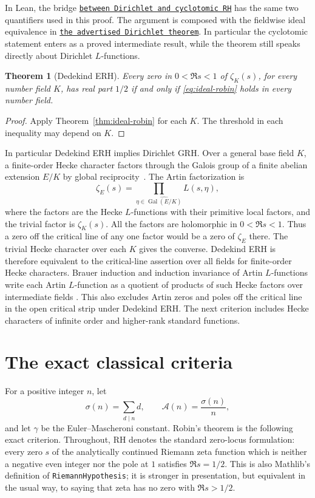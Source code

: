 \documentclass[11pt]{amsart}
\newtheorem{theorem}{Theorem}[section]
\theoremstyle{definition}
\theoremstyle{remark}
\numberwithin{equation}{section}
\newcommand{\RH}{\mathrm{RH}}
\newcommand{\euler}{\gamma}
\newcommand{\sig}{\sigma}
\newcommand{\A}{\mathcal{A}}
\newcommand{\leanname}[1]{\texttt{#1}}
\newcommand{\repositoryurl}{https://github.com/kimihiro64/Robin1984}
\newcommand{\proofrevision}{b359826e62c50b6cef55db4b2fcab793232498cc}
\newcommand{\codelink}[2]{%
  \href{\repositoryurl/blob/\proofrevision/#1}{\texttt{#2}}}
\begin{document}
In Lean, the bridge
\codelink{Robin1984/GRH/CyclotomicFactorization.lean\#L201}{between Dirichlet and cyclotomic RH}
has the same two quantifiers used in this proof. The argument is
composed with the fieldwise ideal equivalence in
\codelink{Solution.lean\#L56}{the advertised Dirichlet theorem}.
In particular the cyclotomic statement enters as a proved
intermediate result, while the theorem still speaks directly
about Dirichlet \(L\)-functions.

\begin{theorem}[Dedekind ERH]\label{thm:dedekind-erh}
Every zero in \(0<\Re s<1\) of \(\zeta_K(s)\), for every number field
\(K\), has real part \(1/2\) if and only if \eqref{eq:ideal-robin} holds
in every number field.
\end{theorem}

\begin{proof}
Apply Theorem~\ref{thm:ideal-robin} for each \(K\). The threshold
in each inequality may depend on \(K\).
\end{proof}

In particular Dedekind ERH implies Dirichlet GRH. Over a general
base field \(K\), a finite-order Hecke character factors through
the Galois group of a finite abelian extension \(E/K\) by global
reciprocity~\cite{ArtinTateCFT}. The Artin factorization is
\[
  \zeta_E(s)=\prod_{\eta\in\widehat{\operatorname{Gal}(E/K)}}L(s,\eta),
\]
where the factors are the Hecke \(L\)-functions with their primitive
local factors, and the trivial factor is \(\zeta_K(s)\).
All the factors are holomorphic in \(0<\Re s<1\). Thus a zero
off the critical line of any one factor would be a zero of
\(\zeta_E\) there. The trivial Hecke character over each \(K\)
gives the converse. Dedekind ERH is therefore equivalent to the
critical-line assertion over all fields for finite-order Hecke
characters. Brauer induction and induction invariance of Artin
\(L\)-functions write each Artin \(L\)-function as a quotient of
products of such Hecke factors over intermediate fields
\cite{BrauerArtin1947}. This also excludes Artin zeros and poles
off the critical line in the open critical strip under Dedekind ERH.
The next criterion includes Hecke characters of infinite order
and higher-rank standard functions.

\section{The exact classical criteria}\label{app:classical-criteria}

For a positive integer $n$, let
\[
  \sig(n)=\sum_{d\mid n}d,
  \qquad
  \A(n)=\frac{\sig(n)}{n},
\]
and let $\euler$ be the Euler--Mascheroni constant.  Robin's theorem is the
following exact criterion.  Throughout, $\RH$ denotes the standard
zero-locus formulation: every zero $s$ of the analytically continued
Riemann zeta function which is neither a negative even integer nor the pole
at $1$ satisfies $\Re s=1/2$.  This is also Mathlib's definition of
\leanname{RiemannHypothesis}; it is stronger in presentation, but equivalent
in the usual way, to saying that zeta has no zero with $\Re s>1/2$.
\end{document}
